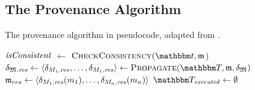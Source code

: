 \subsection{The Provenance Algorithm}

\begin{algorithm}
	\caption{The provenance algorithm in pseudocode, adapted from \cite{gleitze2020orchestration}.}
	\label{algo:orchestration:provenance}
	

    \begin{algorithmic}[1]
        \State $\mathit{isConsistent}$ $\leftarrow$ $\function{CheckConsistency}(\transformationset{t}, \modeltuple{m}$)
            \State \Return{$\bot$} \label{algo:orchestration:provenance:line:bot_input}
        \EndIf
        \State $\changetuple{\metamodeltuple{M},\mathvariable{res}} \gets \tupled{\change{\metamodel{M}{1}, \mathvariable{res}}, \dots, \change{\metamodel{M}{1}, \mathvariable{res}}} \gets \function{Propagate}(\transformationset{T}, \modeltuple{m}, \changetuple{\metamodeltuple{M}})$
            \State \Return{$\bot$} \label{algo:orchestration:provenance:line:bot_orchestration}
        \EndIf
        \State $\mathfrak{m}_{res} \leftarrow \langle \delta_{M_{1},\mathit{res}}(m_{1}), \dots, \delta_{M_{n},\mathit{res}}(m_{n}) \rangle$
        \State {} \label{algo:orchestration:provenance:line:return_result}
    \EndProcedure
    \vspace{\baselineskip}
        \vspace{0.15\baselineskip}
        \State $\provalgexecuted \gets \emptyset$ \label{algo:orchestration:provenance:line:executed_init}
        \vspace{0.3\baselineskip}
        

\end{algorithmic}
\end{algorithm}
